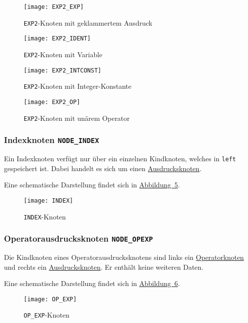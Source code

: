 \begin{figure}[h!]
\label{fig:exp}
\centering
\texttt{[image: EXP2\_EXP]}
\caption{\texttt{EXP2}-Knoten mit geklammertem Ausdruck}
\end{figure}

\begin{figure}[h!]
\label{fig:ident}
\centering
\texttt{[image: EXP2\_IDENT]}
\caption{\texttt{EXP2}-Knoten mit Variable}
\end{figure}

\begin{figure}[h!]
\label{fig:intconst}
\centering
\texttt{[image: EXP2\_INTCONST]}
\caption{\texttt{EXP2}-Knoten mit Integer-Konstante}
\end{figure}

\begin{figure}[h!]
\label{fig:op}
\centering
\texttt{[image: EXP2\_OP]}
\caption{\texttt{EXP2}-Knoten mit unärem Operator}
\end{figure}

\subsubsection{Indexknoten \texttt{NODE\_INDEX}}
\label{sec:indexnode}
Ein Indexknoten verfügt nur über ein einzelnen Kindknoten,
welches in \texttt{left} gespeichert ist.
Dabei handelt es sich um einen \hyperref[sec:expnode]{Ausdrucksknoten}.

Eine schematische Darstellung findet sich in \hyperref[fig:indexnode]{Abbildung~\ref{fig:indexnode}}.

\begin{figure}[h!]
\label{fig:indexnode}
\centering
\texttt{[image: INDEX]}
\caption{\texttt{INDEX}-Knoten}
\end{figure}

\subsubsection{Operatorausdrucksknoten \texttt{NODE\_OPEXP}}
\label{sec:opexpnode}
Die Kindknoten eines Operatorausdrucksknotens sind links ein \hyperref[sec:opnode]{Operatorknoten} und rechts ein \hyperref[sec:expnode]{Ausdrucksknoten}.
Er enthält keine weiteren Daten.

Eine schematische Darstellung findet sich in \hyperref[fig:opexpnode]{Abbildung~\ref{fig:opexpnode}}.

\begin{figure}[h!]
\label{fig:opexpnode}
\centering
\texttt{[image: OP\_EXP]}
\caption{\texttt{OP\_EXP}-Knoten}
\end{figure}

